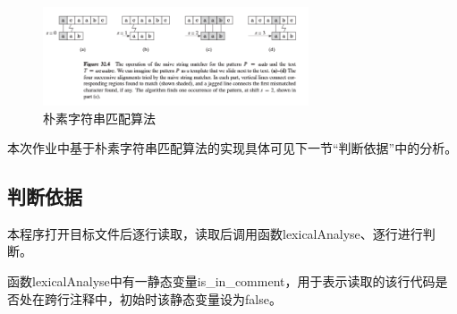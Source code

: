 \documentclass[11pt]{homework}
\begin{document}
  \begin{figure}
    \centering
    \includegraphics[width=0.7\textwidth]{naive-matching-algorithm}
    \caption{朴素字符串匹配算法}
    \label{naive-matching-algorithm}
  \end{figure}

  本次作业中基于朴素字符串匹配算法的实现具体可见下一节“判断依据”中的分析。

  \subsection*{判断依据}

  本程序打开目标文件后逐行读取，读取后调用函数lexicalAnalyse、逐行进行判断。

  函数lexicalAnalyse中有一静态变量is\_in\_comment，用于表示读取的该行代码是否处在跨行注释中，初始时该静态变量设为false。
\end{document}
